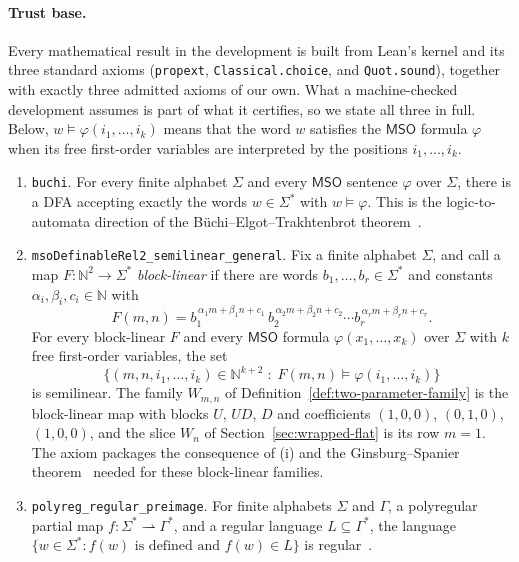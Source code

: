 \documentclass[11pt]{article}
\theoremstyle{definition}
\newcommand{\N}{\mathbb N}
\newcommand{\MSO}{\mathsf{MSO}}
\begin{document}
\paragraph{Trust base.}
Every mathematical result in the development is built from Lean's kernel and
its three standard axioms (\texttt{propext}, \texttt{Classical.choice}, and
\texttt{Quot.sound}), together with exactly three admitted axioms of our own.
What a machine-checked development assumes is part of what it certifies, so we
state all three in full.  Below, $w\models\varphi(i_1,\ldots,i_k)$ means that
the word $w$ satisfies the $\MSO$ formula $\varphi$ when its free first-order
variables are interpreted by the positions $i_1,\ldots,i_k$.
\begin{enumerate}[label=(\roman*)]
\item \texttt{buchi}.  For every finite alphabet $\Sigma$ and every $\MSO$
sentence $\varphi$ over $\Sigma$, there is a DFA accepting exactly the words
$w\in\Sigma^*$ with $w\models\varphi$.  This is the logic-to-automata direction
of the B\"uchi--Elgot--Trakhtenbrot theorem~\cite{Thomas1997}.

\item \texttt{msoDefinableRel2\_semilinear\_general}.  Fix a finite alphabet
$\Sigma$, and call a map $F\colon\N^2\to\Sigma^*$ \emph{block-linear} if there
are words $b_1,\ldots,b_r\in\Sigma^*$ and constants
$\alpha_i,\beta_i,c_i\in\N$ with
\[
   F(m,n)=b_1^{\,\alpha_1m+\beta_1n+c_1}\,
          b_2^{\,\alpha_2m+\beta_2n+c_2}\cdots
          b_r^{\,\alpha_rm+\beta_rn+c_r}.
\]
For every block-linear $F$ and every $\MSO$ formula $\varphi(x_1,\ldots,x_k)$
over $\Sigma$ with $k$ free first-order variables, the set
\[
   \bigl\{(m,n,i_1,\ldots,i_k)\in\N^{k+2}\;:\;
          F(m,n)\models\varphi(i_1,\ldots,i_k)\bigr\}
\]
is semilinear.  The family $W_{m,n}$ of
Definition~\ref{def:two-parameter-family} is the block-linear map with blocks
$U$, $UD$, $D$ and coefficients $(1,0,0)$, $(0,1,0)$, $(1,0,0)$, and the slice
$W_n$ of Section~\ref{sec:wrapped-flat} is its row $m=1$.  The axiom packages
the consequence of (i) and the Ginsburg--Spanier
theorem~\cite{GinsburgSpanier1966} needed for these block-linear families.

\item \texttt{polyreg\_regular\_preimage}.  For finite alphabets
$\Sigma$ and $\Gamma$, a polyregular partial map
$f\colon\Sigma^*\rightharpoonup\Gamma^*$, and a regular language
$L\subseteq\Gamma^*$, the language
$\{w\in\Sigma^*: f(w)\text{ is defined and }f(w)\in L\}$ is
regular~\cite{Bojanczyk2018}.
\end{enumerate}
\end{document}
